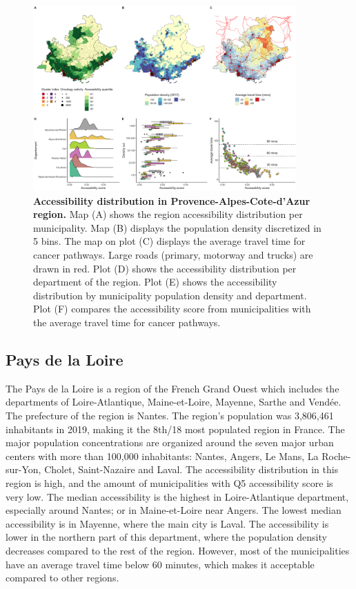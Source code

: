 \begin{figure}[H]
    \includegraphics[width=0.9\textwidth]{images/camion/fig4_accessibility_Provence-Alpes-Cote-d'Azur.png}
    \centering
    \caption{ \textbf{Accessibility distribution in Provence-Alpes-Cote-d'Azur
            region.} Map (A) shows the region accessibility distribution per
        municipality. Map (B) displays the population density discretized in 5
        bins. The map on plot (C) displays the average travel time for cancer
        pathways. Large roads (primary, motorway and trucks) are drawn in red.
        Plot (D) shows the accessibility distribution per department of the
        region. Plot (E) shows the accessibility distribution by municipality
        population density and department. Plot (F) compares the accessibility
        score from municipalities with the average travel time for cancer
        pathways. }
    \label{fig:accessibility-paca}
\end{figure}

\subsection*{Pays de la Loire}

The Pays de la Loire is a region of the French Grand Ouest which includes the
departments of Loire-Atlantique, Maine-et-Loire, Mayenne, Sarthe and Vendée. The
prefecture of the region is Nantes. The region's population was 3,806,461
inhabitants in 2019, making it the 8th/18 most populated region in France. The
major population concentrations are organized around the seven major urban
centers with more than 100,000 inhabitants: Nantes, Angers, Le Mans, La
Roche-sur-Yon, Cholet, Saint-Nazaire and Laval. The accessibility distribution
in this region is high, and the amount of municipalities with Q5 accessibility
score is very low. The median accessibility is the highest in Loire-Atlantique
department, especially around Nantes; or in Maine-et-Loire near Angers. The
lowest median accessibility is in Mayenne, where the main city is Laval. The
accessibility is lower in the northern part of this department, where the
population density decreases compared to the rest of the region. However,
most of the municipalities have an average travel time below 60 minutes, which
makes it acceptable compared to other regions.


